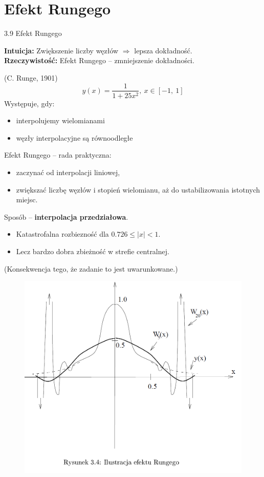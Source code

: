 \section{Efekt Rungego}
\begin{frame}
{3.9 Efekt Rungego}

\begin{block}{}
	\textbf{Intuicja: } Zwiększenie liczby węzłów $\Rightarrow$ lepsza dokładność. \\
	\textbf{Rzeczywistość: } Efekt Rungego -- zmniejszenie dokładności.
\end{block}

(C. Runge, 1901)
$$
y(x)=\frac{1}{1+25x^{2}},\ x\in[-1,\ 1]
$$
Występuje, gdy:
\begin{itemize}
\item interpolujemy wielomianami

\item węzły interpolacyjne są równoodległe
\end{itemize}
\end{frame}
\begin{frame}
Efekt Rungego -- rada praktyczna:

\begin{itemize}
\item zaczynać od interpolacji liniowej,

\item zwiększać liczbę węzłów i stopień wielomianu, aż do ustabilizowania istotnych miejsc.
\end{itemize}


Sposób -- \textbf{interpolacja przedziałowa}.
\begin{itemize}
\item Katastrofalna rozbiezność dla $0.726\leq|x|<1$.

\item Lecz bardzo dobra zbieżność w strefie centralnej.
\end{itemize}

(Konsekwencja tego, że zadanie to jest { uwarunkowane}.)
\end{frame}
\begin{frame}
\begin{figure}[h]
			\includegraphics[scale=0.35]{img/3/interpol_3_9}
	\end{figure}
\end{frame}
